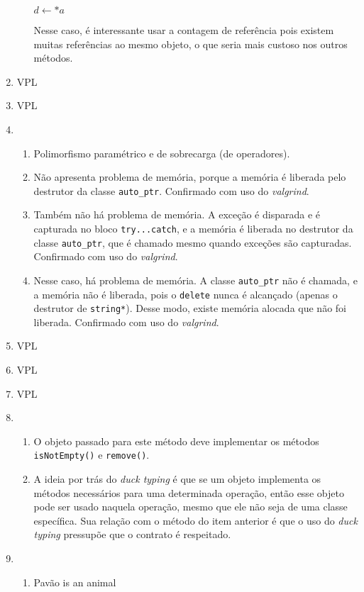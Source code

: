 \documentclass{article}
\begin{document}
\begin{enumerate}
\begin{itemize}
\begin{algorithmic}
          \State $d \gets *a$
        \end{algorithmic}
        Nesse caso, é interessante usar a contagem de referência pois existem muitas referências ao mesmo objeto, o que seria mais custoso nos outros métodos.
    \end{itemize}
  \item VPL
  \item VPL
  \item 
    \begin{enumerate}
      \item Polimorfismo paramétrico e de sobrecarga (de operadores).
      \item Não apresenta problema de memória, porque a memória é liberada pelo destrutor da classe \texttt{auto\_ptr}. Confirmado com uso do \textit{valgrind}.
      \item Também não há problema de memória. A exceção é disparada e é capturada no bloco \texttt{try...catch}, e a memória é liberada no destrutor da classe \texttt{auto\_ptr}, que é chamado mesmo quando exceções são capturadas. Confirmado com uso do \textit{valgrind}.
      \item Nesse caso, há problema de memória. A classe \texttt{auto\_ptr} não é chamada, e a memória não é liberada, pois o \texttt{delete} nunca é alcançado (apenas o destrutor de \texttt{string*}). Desse modo, existe memória alocada que não foi liberada. Confirmado com uso do \textit{valgrind}.
    \end{enumerate}
  \item VPL
  \item VPL
  \item VPL
  \item \begin{enumerate}
      \item O objeto passado para este método deve implementar os métodos \texttt{isNotEmpty()} e \texttt{remove()}.
      \item A ideia por trás do \textit{duck typing} é que se um objeto implementa os métodos necessários para uma determinada operação, então esse objeto pode ser usado naquela operação, mesmo que ele não seja de uma classe específica. Sua relação com o método do item anterior é que o uso do \textit{duck typing} pressupõe que o contrato é respeitado.
    \end{enumerate}
  \item
    \begin{enumerate}
      \item Pavão is an animal

\end{enumerate}
\end{enumerate}
\end{document}
